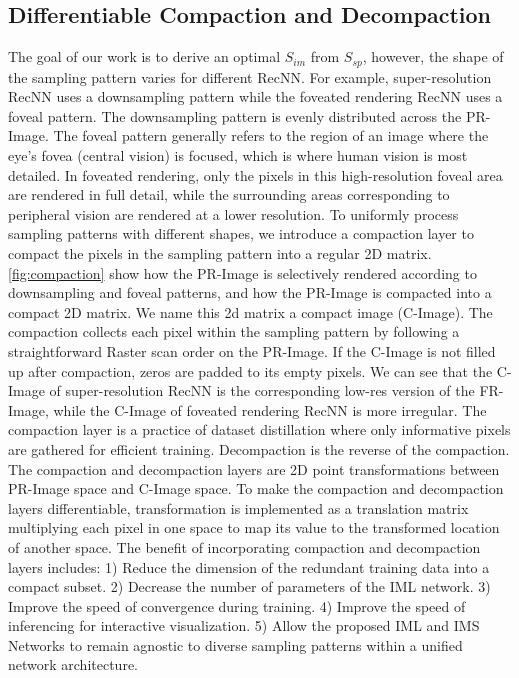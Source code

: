 \subsection{Differentiable Compaction and Decompaction}
The goal of our work is to derive an optimal $S_{im}$ from $S_{sp}$, however, the shape of the sampling pattern varies for different RecNN. For example, super-resolution RecNN uses a downsampling pattern while the foveated rendering RecNN uses a foveal pattern. The downsampling pattern is evenly distributed across the PR-Image. The foveal pattern generally refers to the region of an image where the eye's fovea (central vision) is focused, which is where human vision is most detailed. In foveated rendering, only the pixels in this high-resolution foveal area are rendered in full detail, while the surrounding areas corresponding to peripheral vision are rendered at a lower resolution. To uniformly process sampling patterns with different shapes, we introduce a compaction layer to compact the pixels in the sampling pattern into a regular 2D matrix. \cref{fig:compaction} show how the PR-Image is selectively rendered according to downsampling and foveal patterns, and how the PR-Image is compacted into a compact 2D matrix. We name this 2d matrix a compact image (C-Image). The compaction collects each pixel within the sampling pattern by following a straightforward Raster scan order on the PR-Image. If the C-Image is not filled up after compaction, zeros are padded to its empty pixels. We can see that the C-Image of super-resolution RecNN is the corresponding low-res version of the FR-Image, while the C-Image of foveated rendering RecNN is more irregular. The compaction layer is a practice of dataset distillation where only informative pixels are gathered for efficient training. Decompaction is the reverse of the compaction. The compaction and decompaction layers are 2D point transformations between PR-Image space and C-Image space. To make the compaction and decompaction layers differentiable, transformation is implemented as a translation matrix multiplying each pixel in one space to map its value to the transformed location of another space. The benefit of incorporating compaction and decompaction layers includes: 1) Reduce the dimension of the redundant training data into a compact subset. 2) Decrease the number of parameters of the IML network. 3) Improve the speed of convergence during training. 4) Improve the speed of inferencing for interactive visualization. 5) Allow the proposed IML and IMS Networks to remain agnostic to diverse sampling patterns within a unified network architecture.

